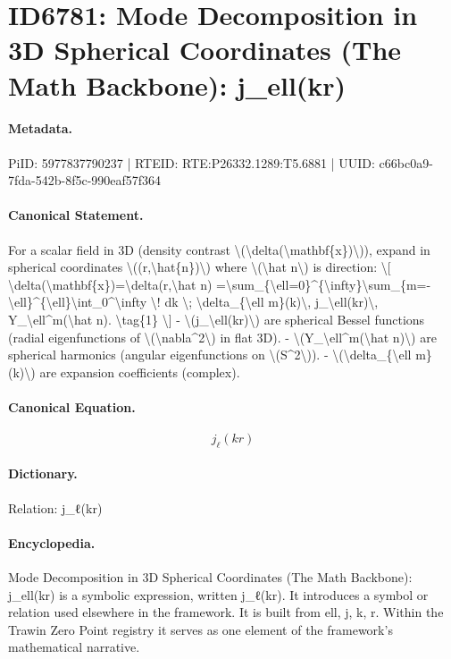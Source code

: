 \section*{ID6781: Mode Decomposition in 3D Spherical Coordinates (The Math Backbone): j\_ell(kr)}
\paragraph{Metadata.}
PiID: 5977837790237 | RTEID: RTE:P26332.1289:T5.6881 | UUID: c66bc0a9-7fda-542b-8f5c-990eaf57f364

\paragraph{Canonical Statement.}
For a scalar field in 3D (density contrast \textbackslash{}(\textbackslash{}delta(\textbackslash{}mathbf\{x\})\textbackslash{})), expand in spherical coordinates \textbackslash{}((r,\textbackslash{}hat\{n\})\textbackslash{}) where \textbackslash{}(\textbackslash{}hat n\textbackslash{}) is direction: \textbackslash{}[ \textbackslash{}delta(\textbackslash{}mathbf\{x\})=\textbackslash{}delta(r,\textbackslash{}hat n) =\textbackslash{}sum\_\{\textbackslash{}ell=0\}\textasciicircum{}\{\textbackslash{}infty\}\textbackslash{}sum\_\{m=-\textbackslash{}ell\}\textasciicircum{}\{\textbackslash{}ell\}\textbackslash{}int\_0\textasciicircum{}\textbackslash{}infty \textbackslash{}! dk \textbackslash{}; \textbackslash{}delta\_\{\textbackslash{}ell m\}(k)\textbackslash{}, j\_\textbackslash{}ell(kr)\textbackslash{}, Y\_\textbackslash{}ell\textasciicircum{}m(\textbackslash{}hat n). \textbackslash{}tag\{1\} \textbackslash{}] - \textbackslash{}(j\_\textbackslash{}ell(kr)\textbackslash{}) are spherical Bessel functions (radial eigenfunctions of \textbackslash{}(\textbackslash{}nabla\textasciicircum{}2\textbackslash{}) in flat 3D). - \textbackslash{}(Y\_\textbackslash{}ell\textasciicircum{}m(\textbackslash{}hat n)\textbackslash{}) are spherical harmonics (angular eigenfunctions on \textbackslash{}(S\textasciicircum{}2\textbackslash{})). - \textbackslash{}(\textbackslash{}delta\_\{\textbackslash{}ell m\}(k)\textbackslash{}) are expansion coefficients (complex).

\paragraph{Canonical Equation.}
\[
j_\ell(kr)
\]

\paragraph{Dictionary.}
Relation: j\_ℓ(kr)

\paragraph{Encyclopedia.}
Mode Decomposition in 3D Spherical Coordinates (The Math Backbone): j\_ell(kr) is a symbolic expression, written j\_ℓ(kr). It introduces a symbol or relation used elsewhere in the framework. It is built from ell, j, k, r. Within the Trawin Zero Point registry it serves as one element of the framework's mathematical narrative.
